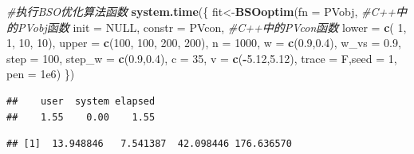 \documentclass[]{ctexbook}
\newenvironment{Shaded}{\begin{snugshade}}{\end{snugshade}}
\newcommand{\KeywordTok}[1]{\textcolor[rgb]{0.13,0.29,0.53}{\textbf{#1}}}
\newcommand{\DataTypeTok}[1]{\textcolor[rgb]{0.13,0.29,0.53}{#1}}
\newcommand{\DecValTok}[1]{\textcolor[rgb]{0.00,0.00,0.81}{#1}}
\newcommand{\FloatTok}[1]{\textcolor[rgb]{0.00,0.00,0.81}{#1}}
\newcommand{\CommentTok}[1]{\textcolor[rgb]{0.56,0.35,0.01}{\textit{#1}}}
\newcommand{\OtherTok}[1]{\textcolor[rgb]{0.56,0.35,0.01}{#1}}
\newcommand{\OperatorTok}[1]{\textcolor[rgb]{0.81,0.36,0.00}{\textbf{#1}}}
\newcommand{\NormalTok}[1]{#1}
\theoremstyle{definition}
\theoremstyle{definition}
\theoremstyle{definition}
\theoremstyle{remark}
\begin{document}
\begin{Shaded}
\begin{Highlighting}[]
\CommentTok{#执行BSO优化算法函数}
\KeywordTok{system.time}\NormalTok{(\{}
\NormalTok{  fit<-}\KeywordTok{BSOoptim}\NormalTok{(}\DataTypeTok{fn =}\NormalTok{ PVobj, }\CommentTok{#C++中的PVobj函数}
         \DataTypeTok{init =} \OtherTok{NULL}\NormalTok{,}
         \DataTypeTok{constr =}\NormalTok{ PVcon, }\CommentTok{#C++中的PVcon函数}
         \DataTypeTok{lower =} \KeywordTok{c}\NormalTok{( }\DecValTok{1}\NormalTok{, }\DecValTok{1}\NormalTok{, }\DecValTok{10}\NormalTok{, }\DecValTok{10}\NormalTok{),}
         \DataTypeTok{upper =} \KeywordTok{c}\NormalTok{(}\DecValTok{100}\NormalTok{, }\DecValTok{100}\NormalTok{, }\DecValTok{200}\NormalTok{, }\DecValTok{200}\NormalTok{),}
         \DataTypeTok{n =} \DecValTok{1000}\NormalTok{,}
         \DataTypeTok{w =} \KeywordTok{c}\NormalTok{(}\FloatTok{0.9}\NormalTok{,}\FloatTok{0.4}\NormalTok{),}
         \DataTypeTok{w_vs =} \FloatTok{0.9}\NormalTok{,}
         \DataTypeTok{step =} \DecValTok{100}\NormalTok{,}
         \DataTypeTok{step_w =} \KeywordTok{c}\NormalTok{(}\FloatTok{0.9}\NormalTok{,}\FloatTok{0.4}\NormalTok{),}
         \DataTypeTok{c =} \DecValTok{35}\NormalTok{,}
         \DataTypeTok{v =} \KeywordTok{c}\NormalTok{(}\OperatorTok{-}\FloatTok{5.12}\NormalTok{,}\FloatTok{5.12}\NormalTok{),}
         \DataTypeTok{trace =}\NormalTok{ F,}\DataTypeTok{seed =} \DecValTok{1}\NormalTok{,}
         \DataTypeTok{pen =} \FloatTok{1e6}\NormalTok{)}
\NormalTok{\})}
\end{Highlighting}
\end{Shaded}

\begin{verbatim}
##    user  system elapsed 
##    1.55    0.00    1.55
\end{verbatim}

\begin{Shaded}
\end{Shaded}

\begin{verbatim}
## [1]  13.948846   7.541387  42.098446 176.636570
\end{verbatim}

\begin{Shaded}
\end{Shaded}
\end{document}
